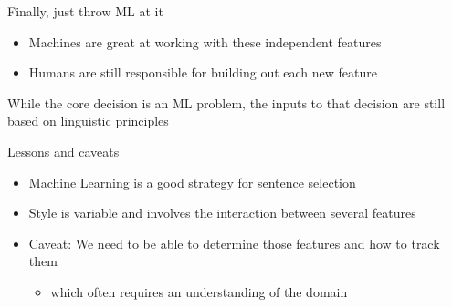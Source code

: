 \documentclass[10pt, compress]{beamer}		%
\begin{document}

\begin{frame}{Finally, just throw ML at it}

	\begin{itemize}
		\item Machines are great at working with these independent features
		\item Humans are still responsible for building out each new feature\pause
	\end{itemize}
    While the core decision is an ML problem, the inputs to that
    decision are still based on linguistic principles

\end{frame}


\begin{frame}{Lessons and caveats}
	\begin{itemize}
		\item Machine Learning is a good strategy for sentence selection
		\item Style is variable and involves the interaction between several features \pause
		\item \alert{Caveat:} We need to be able to determine those features and how to track them
		\begin{itemize}
			\item which often requires an understanding of the domain
		\end{itemize}
	\end{itemize}
\end{frame}


\end{document}

